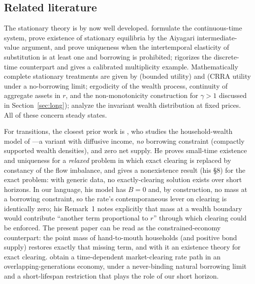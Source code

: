 \documentclass[11pt]{article}
\theoremstyle{definition}
\theoremstyle{remark}
\begin{document}
\subsection{Related literature}
\label{sec:literature}

The stationary theory is by now well developed.
\citet{AHLLM2022} formulate the continuous-time system, prove
existence of stationary equilibria by the Aiyagari intermediate-value
argument, and prove uniqueness when the intertemporal elasticity of
substitution is at least one and borrowing is prohibited;
\citet{Acikgoz2018} rigorizes the discrete-time counterpart and gives
a calibrated multiplicity example. Mathematically complete stationary
treatments are given by \citet{Shigeta2023} (bounded utility) and
\citet{Hofer2025} (CRRA utility under a no-borrowing limit;
ergodicity of the wealth process, continuity of aggregate assets in
$r$, and the non-monotonicity construction for $\gamma>1$ discussed in
Section~\ref{sec:long}); \citet{BayerRendallWaelde2019} analyze the
invariant wealth distribution at fixed prices. All of these concern
steady states.

For transitions, the closest prior work is \citet{Ambrose2021}, who
studies the household-wealth model of \citet{ABLLM2014}---a variant
with diffusive income, \emph{no} borrowing constraint (compactly
supported wealth densities), and zero net supply. He proves small-time
existence and uniqueness for a \emph{relaxed} problem in which exact
clearing is replaced by constancy of the flow imbalance, and gives a
nonexistence result (his \S8) for the exact problem: with generic
data, no exactly-clearing solution exists over short horizons. In our
language, his model has $B=0$ and, by construction, no mass at a
borrowing constraint, so the rate's contemporaneous lever on clearing
is identically zero; his Remark~1 notes explicitly that mass at a
wealth boundary would contribute ``another term proportional to
$r$'' through which clearing could be enforced. The present paper can
be read as the constrained-economy counterpart: the point mass of
hand-to-mouth households (and positive bond supply) restores exactly
that missing term, and with it an existence theory for exact
clearing. \citet{ChenEtAl2025} obtain a time-dependent
market-clearing rate path in an overlapping-generations economy, under
a never-binding natural borrowing limit and a short-lifespan
restriction that plays the role of our short horizon.
\end{document}
